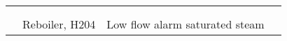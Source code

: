 \begin{table}[p]
\begin{tabularx}{\linewidth}{@{}lp{2cm}XX@{}}
    &                           &                                                                                                                                                               &                                                                                                                                                                                                              \\ \cmidrule(l){3-4} 
    &                           &                                                                                                                                                               &                                                                                                                                                                                                              \\ \cmidrule(l){2-4} 
    & Reboiler, H204            & Low flow alarm saturated steam                                                                                                                                &                                                                                                                                                                                                              \\ \bottomrule
\end{tabularx}%
\end{table}
